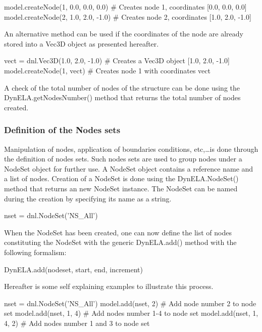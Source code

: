 \begin{PythonListing}
model.createNode(1, 0.0, 0.0, 0.0)  # Creates node 1, coordinates [0.0, 0.0, 0.0]
model.createNode(2, 1.0, 2.0, -1.0) # Creates node 2, coordinates [1.0, 2.0, -1.0]
\end{PythonListing}

An alternative method can be used if the coordinates of the node are already stored into a Vec3D object as presented hereafter.

\begin{PythonListing}
vect = dnl.Vec3D(1.0, 2.0, -1.0) # Creates a Vec3D object [1.0, 2.0, -1.0]
model.createNode(1, vect)        # Creates node 1 with coordinates vect
\end{PythonListing}

A check of the total number of nodes of the structure can be done using the \textsf{DynELA.getNodesNumber()} method that returns the total number of nodes created.

\subsubsection{Definition of the Nodes sets}

Manipulation of nodes, application of boundaries conditions, etc,\ldots is done through the definition of nodes sets. Such nodes sets are used to group nodes under a \textsf{NodeSet} object for further use. A \textsf{NodeSet} object contains a reference name and a list of nodes. Creation of a \textsf{NodeSet} is done using the \textsf{DynELA.NodeSet()} method that returns an new \textsf{NodeSet} instance. The \textsf{NodeSet} can be named during the creation by specifying its name as a string.

\begin{PythonListing}
nset = dnl.NodeSet('NS_All')
\end{PythonListing}

When the \textsf{NodeSet} has been created, one can now define the list of nodes constituting the \textsf{NodeSet} with the generic \textsf{DynELA.add()} method with the following formalism:

\textsf{DynELA.add(nodeset, start, end, increment)}

Hereafter is some self explaining examples to illustrate this process.

\begin{PythonListing}
nset = dnl.NodeSet('NS_All')
model.add(nset, 2)       # Add node number 2 to node set
model.add(nset, 1, 4)    # Add nodes number 1-4 to node set
model.add(nset, 1, 4, 2) # Add nodes number 1 and 3 to node set
\end{PythonListing}

